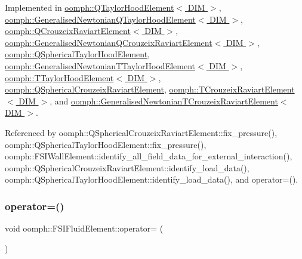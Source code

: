 Implemented in \hyperlink{classoomph_1_1QTaylorHoodElement_ad1488e770c1364c5d6f25ce30532d9d4}{oomph\+::\+Q\+Taylor\+Hood\+Element$<$ D\+I\+M $>$}, \hyperlink{classoomph_1_1GeneralisedNewtonianQTaylorHoodElement_a369b7a71e40d491ea34858e940431492}{oomph\+::\+Generalised\+Newtonian\+Q\+Taylor\+Hood\+Element$<$ D\+I\+M $>$}, \hyperlink{classoomph_1_1QCrouzeixRaviartElement_ad01a1d2af20703dfb57971bfba4d376e}{oomph\+::\+Q\+Crouzeix\+Raviart\+Element$<$ D\+I\+M $>$}, \hyperlink{classoomph_1_1GeneralisedNewtonianQCrouzeixRaviartElement_aa27ed653fcc13e9f615d0f120ccb09c6}{oomph\+::\+Generalised\+Newtonian\+Q\+Crouzeix\+Raviart\+Element$<$ D\+I\+M $>$}, \hyperlink{classoomph_1_1QSphericalTaylorHoodElement_a53b2b394a10a6a415a79c3d53aaf2a51}{oomph\+::\+Q\+Spherical\+Taylor\+Hood\+Element}, \hyperlink{classoomph_1_1GeneralisedNewtonianTTaylorHoodElement_a9dba8c6c24e6105d289590f0b3ac0a40}{oomph\+::\+Generalised\+Newtonian\+T\+Taylor\+Hood\+Element$<$ D\+I\+M $>$}, \hyperlink{classoomph_1_1TTaylorHoodElement_ab1d985e874073ad6900655563dbfacab}{oomph\+::\+T\+Taylor\+Hood\+Element$<$ D\+I\+M $>$}, \hyperlink{classoomph_1_1QSphericalCrouzeixRaviartElement_a1fc00abb3eec401fe649f920267bc7f0}{oomph\+::\+Q\+Spherical\+Crouzeix\+Raviart\+Element}, \hyperlink{classoomph_1_1TCrouzeixRaviartElement_aa79bbce43b6f27acb68f87a5c4a57b9b}{oomph\+::\+T\+Crouzeix\+Raviart\+Element$<$ D\+I\+M $>$}, and \hyperlink{classoomph_1_1GeneralisedNewtonianTCrouzeixRaviartElement_a9b7ff8a20c83f19dd4154105b4d11487}{oomph\+::\+Generalised\+Newtonian\+T\+Crouzeix\+Raviart\+Element$<$ D\+I\+M $>$}.



Referenced by oomph\+::\+Q\+Spherical\+Crouzeix\+Raviart\+Element\+::fix\+\_\+pressure(), oomph\+::\+Q\+Spherical\+Taylor\+Hood\+Element\+::fix\+\_\+pressure(), oomph\+::\+F\+S\+I\+Wall\+Element\+::identify\+\_\+all\+\_\+field\+\_\+data\+\_\+for\+\_\+external\+\_\+interaction(), oomph\+::\+Q\+Spherical\+Crouzeix\+Raviart\+Element\+::identify\+\_\+load\+\_\+data(), oomph\+::\+Q\+Spherical\+Taylor\+Hood\+Element\+::identify\+\_\+load\+\_\+data(), and operator=().

\mbox{\label{classoomph_1_1FSIFluidElement_a5d5b8b33130b85f908b04fc2d8ddd691}} 
\subsubsection{\texorpdfstring{operator=()}{operator=()}}
{\footnotesize\ttfamily void oomph\+::\+F\+S\+I\+Fluid\+Element\+::operator= (\begin{DoxyParamCaption}\item[{const \hyperlink{classoomph_1_1FSIFluidElement}{F\+S\+I\+Fluid\+Element} \&}]{ }\end{DoxyParamCaption})\hspace{0.3cm}{\ttfamily [inline]}}



